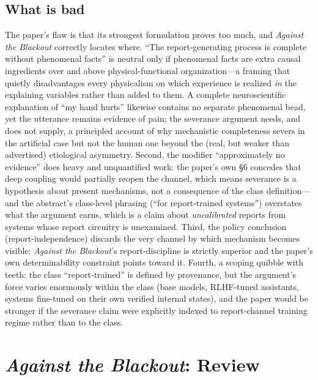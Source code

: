\documentclass[11pt]{article}
\newcommand{\AB}{\emph{Against the Blackout}}
\begin{document}
\subsection{What is bad}
The paper's flaw is that its strongest formulation proves too much, and \AB{} correctly locates where. ``The report-generating process is complete without phenomenal facts'' is neutral only if phenomenal facts are extra causal ingredients over and above physical-functional organization---a framing that quietly disadvantages every physicalism on which experience is realized \emph{in} the explaining variables rather than added to them. A complete neuroscientific explanation of ``my hand hurts'' likewise contains no separate phenomenal bead, yet the utterance remains evidence of pain; the severance argument needs, and does not supply, a principled account of why mechanistic completeness severs in the artificial case but not the human one beyond the (real, but weaker than advertised) etiological asymmetry. Second, the modifier ``approximately no evidence'' does heavy and unquantified work: the paper's own \S 6 concedes that deep coupling would partially reopen the channel, which means severance is a hypothesis about present mechanisms, not a consequence of the class definition---and the abstract's class-level phrasing (``for report-trained systems'') overstates what the argument earns, which is a claim about \emph{uncalibrated} reports from systems whose report circuitry is unexamined. Third, the policy conclusion (report-independence) discards the very channel by which mechanism becomes visible; \AB{}'s report-discipline is strictly superior and the paper's own determinability constraint points toward it. Fourth, a scoping quibble with teeth: the class ``report-trained'' is defined by provenance, but the argument's force varies enormously within the class (base models, RLHF-tuned assistants, systems fine-tuned on their own verified internal states), and the paper would be stronger if the severance claim were explicitly indexed to report-channel training regime rather than to the class.

\section{\AB{}: Review}
\end{document}
